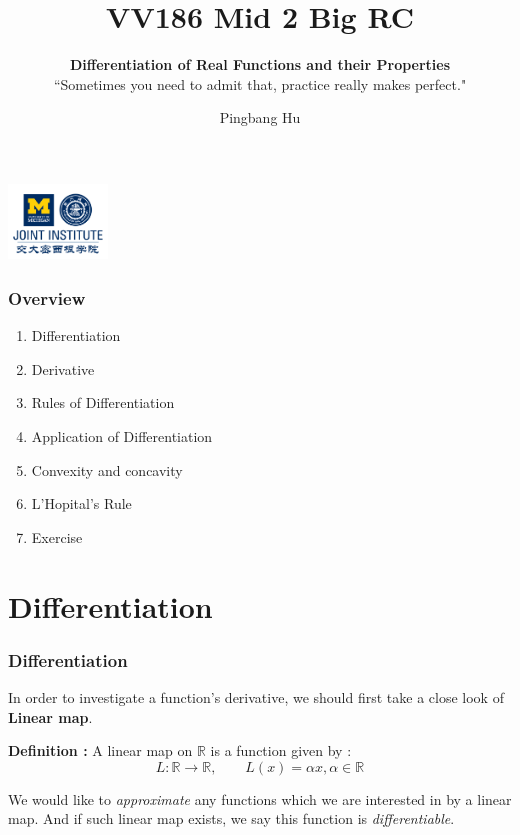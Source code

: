 \documentclass[12pt, t]{beamer}
\title{VV186 Mid 2 Big RC}
\subtitle{\textbf{Differentiation of Real Functions and their Properties}\\``Sometimes you need to admit that, practice really makes perfect."}
\institute[UM-SJTU JI]{University of Michigan-Shanghai Jiao Tong University Joint Institute}
\author{Pingbang Hu}
\renewcommand{\emph}[1]{{\color{Turquoise3}\textsl{#1}}}
\begin{document}
\begin{frame}
    \titlepage
    \begin{center}
        \includegraphics[height=2cm]{Figures/logo/logo2.png}
    \end{center}
\end{frame}

\begin{frame}
    \frametitle{Overview}
    \begin{enumerate}
        \item Differentiation
        \item Derivative
        \item Rules of Differentiation
        \item Application of Differentiation
        \item Convexity and concavity
        \item L'Hopital's Rule
        \item Exercise
    \end{enumerate}
\end{frame}

\section{Differentiation}
\begin{frame}
    \frametitle{Differentiation}

    In order to investigate a function's derivative, we should first take a close look of \textbf{Linear map}.

    \vspace{2em}
    \textbf{Definition : } A linear map on $\mathbb{R}$ is a function given by :
    \begin{equation*}
        L: \mathbb{R}\rightarrow\mathbb{R}, \qquad L(x)=\alpha x, \alpha \in \mathbb{R}
    \end{equation*}

    \vspace{1em}
    We would like to \emph{approximate} any functions which we are interested in by a linear map. And if
    such linear map exists, we say this function is \emph{differentiable}.
\end{frame}
\end{document}
